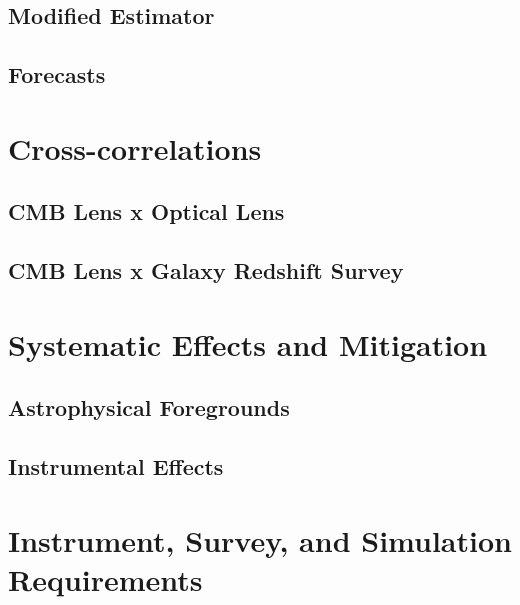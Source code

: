 \subsection{Modified Estimator}

\subsection{Forecasts}

\section{Cross-correlations}

\subsection{CMB Lens x Optical Lens}

\subsection{CMB Lens x Galaxy Redshift Survey}

\clearpage

\section{Systematic Effects and Mitigation}

\subsection{Astrophysical Foregrounds}

\subsection{Instrumental Effects}

\section{Instrument, Survey, and Simulation Requirements}


%



